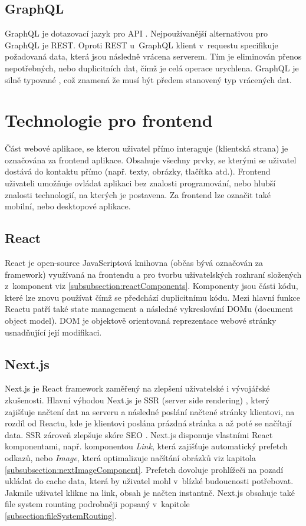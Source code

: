 \documentclass[12pt, a4paper,
  oneside,      %
]{report}
\begin{document}
    \subsection{GraphQL}
    GraphQL je dotazovací jazyk pro API \cite{graphqlIntroduction}. Nejpoužívanější alternativou pro GraphQL je REST. Oproti REST u~GraphQL klient v~requestu specifikuje požadovaná data, která jsou následně vrácena serverem. Tím je eliminován přenos nepotřebných, nebo duplicitních dat, čímž je celá operace urychlena. GraphQL je silně typované \cite{graphqlTypes}, což znamená že musí být předem stanovený typ vrácených dat. \cite{restApiRedHat}\cite{whatIsApiAws}


\section{Technologie pro frontend}
Část webové aplikace, se kterou uživatel přímo interaguje (klientská strana) je označována za frontend aplikace. Obsahuje všechny prvky, se kterými se uživatel dostává do kontaktu přímo (např. texty, obrázky, tlačítka atd.). Frontend uživateli umožňuje ovládat aplikaci bez znalosti programování, nebo hlubší znalosti technologií, na kterých je postavena. Za frontend lze označit také mobilní, nebo desktopové aplikace. \cite{whatIsFrontend}

    \clearpage
    \subsection{React}
    React je open-source JavaScriptová knihovna (občas bývá označován za framework) využívaná na frontendu a pro tvorbu uživatelských rozhraní složených z~komponent viz \ref{subsubsection:reactComponents}. Komponenty jsou části kódu, které lze znovu používat čímž se předchází duplicitnímu kódu. Mezi hlavní funkce Reactu patří také state management a následné vykreslování DOMu (document object model). DOM je objektově orientovaná reprezentace webové stránky usnadňující její modifikaci. \cite{reactComponentsAndProps}\cite{gettingStartedReact}
    \subsection{Next.js}
    Next.js je React framework zaměřený na zlepšení uživatelské i vývojářské zkušenosti. Hlavní výhodou Next.js je SSR (server side rendering) \cite{whatIsSSR}, který zajišťuje načtení dat na serveru a následné poslání načtené stránky klientovi, na rozdíl od Reactu, kde je klientovi poslána prázdná stránka a až poté se načítají data. SSR zároveň zlepšuje skóre SEO \cite{whatIsSEO}. Next.js disponuje vlastními React komponentami, např. komponentou \textit{Link}, která zajišťuje automatický prefetch odkazů, nebo \textit{Image}, která optimalizuje načítání obrázků viz kapitola \ref{subsubsection:nextImageComponent}. Prefetch dovoluje prohlížeči na pozadí ukládat do cache data, která by uživatel mohl v~blízké budoucnosti potřebovat. Jakmile uživatel klikne na link, obsah je načten instantně. Next.js obsahuje také file system rounting podrobněji popsaný v~kapitole \ref{subsection:fileSystemRouting}. \cite{nextGetStarted}
\end{document}

